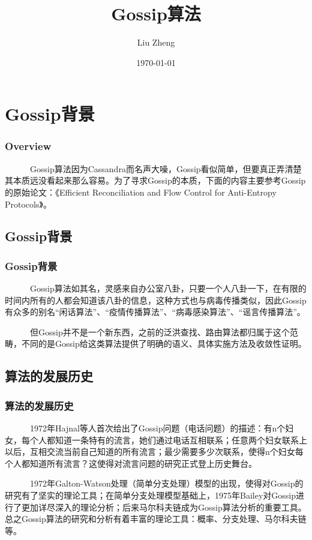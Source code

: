 \documentclass[slidestop,compress,mathserif,c]{beamer}
\title{Gossip算法}
\author{Liu Zheng}
\date{\today}
\institute{同济大学电信学院}
\begin{document}
\frame{\titlepage}

\section{Gossip背景}

\begin{frame}
\frametitle{Overview}
~~~~~~Gossip算法因为Cassandra而名声大噪，Gossip看似简单，但要真正弄清楚其本质远没看起来那么容易。为了寻求Gossip的本质，下面的内容主要参考Gossip的原始论文：《Efficient Reconciliation and Flow Control for Anti-Entropy Protocols》。
\end{frame}

\subsection{\hfill  Gossip背景}
\begin{frame}
\frametitle{Gossip背景}
~~~~~~Gossip算法如其名，灵感来自办公室八卦，只要一个人八卦一下，在有限的时间内所有的人都会知道该八卦的信息，这种方式也与病毒传播类似，因此Gossip有众多的别名“闲话算法”、“疫情传播算法”、“病毒感染算法”、“谣言传播算法”。

~~~~~~但Gossip并不是一个新东西，之前的泛洪查找、路由算法都归属于这个范畴，不同的是Gossip给这类算法提供了明确的语义、具体实施方法及收敛性证明。
\end{frame}


\subsection{\hfill 算法的发展历史}
\begin{frame}
\frametitle{算法的发展历史}
~~~~~~1972年Hajnal等人首次给出了Gossip问题（电话问题）的描述：有n个妇女，每个人都知道一条特有的流言，她们通过电话互相联系；任意两个妇女联系上以后，互相交流当前自己知道的所有流言；最少需要多少次联系，使得n个妇女每个人都知道所有流言？这使得对流言问题的研究正式登上历史舞台。
 
~~~~~~1972年Galton-Watson处理（简单分支处理）模型的出现，使得对Gossip的研究有了坚实的理论工具；在简单分支处理模型基础上，1975年Bailey对Gossip进行了更加详尽深入的理论分析；后来马尔科夫链成为Gossip算法分析的重要工具。总之Gossip算法的研究和分析有着丰富的理论工具：概率、分支处理、马尔科夫链等。
\end{frame}
\end{document}
